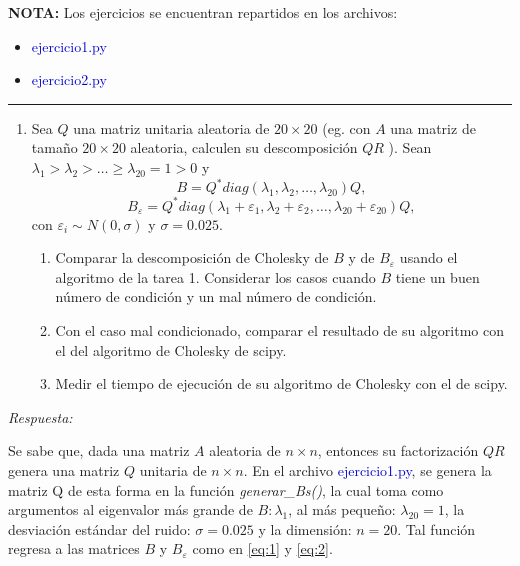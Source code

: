 \textcolor{BrickRed}{\bf NOTA:}  Los ejercicios se encuentran repartidos en los archivos:
\begin{itemize}
	\item \textcolor{mediumblue}{ejercicio1.py}
	\item \textcolor{mediumblue}{ejercicio2.py}
\end{itemize}

\vspace{5mm}
{\color{lightgray} \hrule}
\begin{enumerate}
	\item Sea $Q$ una matriz unitaria aleatoria de $20 \times 20$ (eg. con $A$ una matriz de tamaño $20 \times 20$ aleatoria, calculen su descomposición $Q R$ ). Sean $\lambda_1>\lambda_2>\dots \geq \lambda_{20}=1>0$ y 
	\begin{equation} \label{eq:1}
		B=Q^{*} diag\left(\lambda_1, \lambda_2, \dots, \lambda_{20}\right) Q,
	\end{equation}
	\begin{equation} \label{eq:2}
		B_{\varepsilon}=Q^* diag\left(\lambda_1+\varepsilon_1, \lambda_2+\varepsilon_2, \ldots, \lambda_{20}+\varepsilon_{20}\right) Q,
	\end{equation}
	con $\varepsilon_i  \sim N(0, \sigma)$ y $ \sigma=0.025$.
	
	\begin{enumerate}
		\item Comparar la descomposición de Cholesky de $B$ y de $B_{\varepsilon}$ usando el algoritmo de la tarea 1. Considerar los casos cuando $B$ tiene un buen número de condición y un mal número de condición.
		\item Con el caso mal condicionado, comparar el resultado de su algoritmo con el del algoritmo de Cholesky de scipy.
		\item Medir el tiempo de ejecución de su algoritmo de Cholesky con el de scipy.
	\end{enumerate}
\end{enumerate}

\textcolor{BrickRed}{\it Respuesta:}

Se sabe que, dada una matriz $A$ aleatoria de $n\times n$, entonces su factorización $QR$ genera una matriz $Q$ unitaria de $n\times n$. En el archivo \textcolor{mediumblue}{ejercicio1.py}, se genera la matriz Q de esta forma en la función \textit{generar\_Bs()}, la cual toma como argumentos al eigenvalor más grande de $B:\lambda_1$, al más pequeño: $\lambda_{20}=1$, la desviación estándar del ruido: $\sigma = 0.025$ y la dimensión: $n=20$. Tal función regresa a las matrices $B$ y $B_\varepsilon$ como en \eqref{eq:1} y \eqref{eq:2}.

